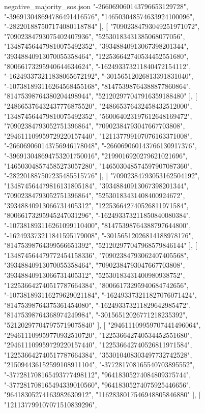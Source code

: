 \begin{filecontents*}[overwrite]{negative_majority_sos.json}
    "-266069060143796653129728",
    "-396913048694786491416576",
    "146503048574633924100096",
    "-282201887507174080118784"
   ],
   [
    "70902384793049251971072",
    "70902384793075402407936",
    "52530183431385068077056",
    "134874564479810075492352",
    "39348840913067398201344",
    "39348840913070055358464",
    "122536642740534452551680",
    "80066173295940644634624",
    "-162493373211840472154112",
    "-162493373211838065672192",
    "-30156512026813391831040",
    "-107381893116264568455168",
    "81475398764388877860864",
    "81475398764380204498944",
    "521202977047916359188480"
   ],
   [
    "248665376432437776875520",
    "248665376432458432512000",
    "134874564479810075492352",
    "560064023197612648169472",
    "70902384793052751396864",
    "70902384793047667703808",
    "294611109959729220157440",
    "121137799107076163371008",
    "-266069060143756946178048",
    "-266069060143766130917376",
    "-396913048694753201750016",
    "2199016920279621021696",
    "146503048574585273057280",
    "146503048574597907087360",
    "-282201887507235485515776"
   ],
   [
    "70902384793053162504192",
    "134874564479816131805184",
    "39348840913067398201344",
    "70902384793052751396864",
    "52530183431408400924672",
    "39348840913066731405312",
    "122536642740526811971584",
    "80066173295945247031296",
    "-162493373211850840080384",
    "-107381893116261099110400",
    "81475398764388797644800",
    "-162493373211841595179008",
    "-30156512026814188978176",
    "81475398764399566651392",
    "521202977047968579846144"
   ],
   [
    "134874564479772454158336",
    "70902384793062407405568",
    "39348840913070055358464",
    "70902384793047667703808",
    "39348840913066731405312",
    "52530183431400980938752",
    "122536642740517787664384",
    "80066173295940684742656",
    "-107381893116279629021184",
    "-162493373211827076071424",
    "81475398764375361454080",
    "-162493373211829642985472",
    "81475398764368974249984",
    "-30156512026771218235392",
    "521202977047975719075840"
   ],
   [
    "294611109959707441496064",
    "294611109959770932510720",
    "122536642740534452551680",
    "294611109959729220157440",
    "122536642740526811971584",
    "122536642740517787664384",
    "353010408303497732742528",
    "215094436152599108911104",
    "-377281708165540703895552",
    "-377281708165493777498112",
    "96418305274084809375744",
    "-377281708165494339010560",
    "96418305274075925446656",
    "96418305274163982630912",
    "1162838017546948805846880"
   ],
   [
    "121137799107071510839296",

\end{filecontents*}

